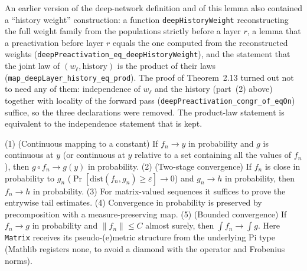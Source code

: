 \begin{remark}\label{rmk:ntkdeep:deepIndependenceChange}
An earlier version of the deep-network definition and of this lemma also contained a ``history weight'' construction: a function \texttt{deepHistoryWeight} reconstructing the full weight family from the populations strictly before a layer $r$, a lemma that a preactivation before layer $r$ equals the one computed from the reconstructed weights (\texttt{deepPreactivation\_eq\_deepHistoryWeight}), and the statement that the joint law of $(w_\ell,\text{history})$ is the product of their laws (\texttt{map\_deepLayer\_history\_eq\_prod}). The proof of Theorem~2.13 turned out not to need any of them: independence of $w_\ell$ and the history (part~(2) above) together with locality of the forward pass (\texttt{deepPreactivation\_congr\_of\_eqOn}) suffice, so the three declarations were removed. The product-law statement is equivalent to the independence statement that is kept.
\end{remark}


\begin{lemma}\label{lem:ntkdeep:probTools}
  \leanok
(1) (Continuous mapping to a constant) If $f_n\to y$ in probability and $g$ is continuous at $y$ (or continuous at $y$ relative to a set containing all the values of $f_n$), then $g\circ f_n\to g(y)$ in probability.
(2) (Two-stage convergence) If $f_n$ is close in probability to $g_n$ ($\Pr[\mathrm{dist}(f_n,g_n)\ge\varepsilon]\to0$) and $g_n\to h$ in probability, then $f_n\to h$ in probability.
(3) For matrix-valued sequences it suffices to prove the entrywise tail estimates.
(4) Convergence in probability is preserved by precomposition with a measure-preserving map.
(5) (Bounded convergence) If $f_n\to g$ in probability and $\|f_n\|\le C$ almost surely, then $\int f_n\to\int g$.
Here \texttt{Matrix} receives its pseudo-(e)metric structure from the underlying Pi type (Mathlib registers none, to avoid a diamond with the operator and Frobenius norms).
\end{lemma}

